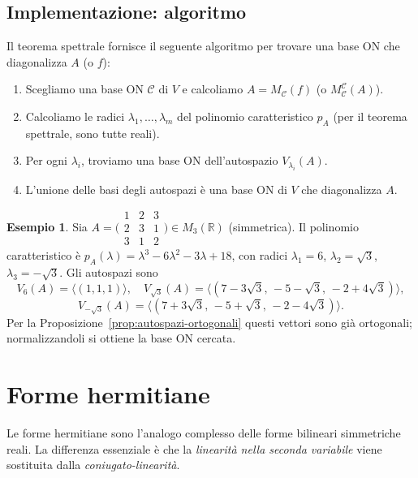 \documentclass[11pt, a4paper]{book}
\theoremstyle{definition}
\newtheorem{esempio}[definizione]{Esempio}
\theoremstyle{plain}
\theoremstyle{remark}
\newcommand{\R}{\mathbb{R}}
\begin{document}
\subsection{Implementazione: algoritmo}

Il teorema spettrale fornisce il seguente algoritmo per trovare una base ON che diagonalizza $A$ (o $f$):

\begin{enumerate}
  \item Scegliamo una base ON $\mathcal{C}$ di $V$ e calcoliamo $A = M_\mathcal{C}(f)$ (o $M^\mathcal{C}_\mathcal{C}(A)$).
  \item Calcoliamo le radici $\lambda_1,\ldots,\lambda_m$ del polinomio caratteristico $p_A$ (per il teorema spettrale, sono tutte reali).
  \item Per ogni $\lambda_i$, troviamo una base ON dell'autospazio $V_{\lambda_i}(A)$.
  \item L'unione delle basi degli autospazi è una base ON di $V$ che diagonalizza $A$.
\end{enumerate}

\begin{exbox}
\begin{esempio}
Sia $A = \bigl(\begin{smallmatrix}1&2&3\\2&3&1\\3&1&2\end{smallmatrix}\bigr) \in M_3(\R)$ (simmetrica). Il polinomio caratteristico è $p_A(\lambda) = \lambda^3-6\lambda^2-3\lambda+18$, con radici $\lambda_1 = 6$, $\lambda_2 = \sqrt{3}$, $\lambda_3 = -\sqrt{3}$. Gli autospazi sono
\[
  V_6(A) = \langle (1,1,1)\rangle, \quad V_{\sqrt{3}}(A) = \langle (7-3\sqrt{3},\,-5-\sqrt{3},\,-2+4\sqrt{3})\rangle,
\]
\[
  V_{-\sqrt{3}}(A) = \langle (7+3\sqrt{3},\,-5+\sqrt{3},\,-2-4\sqrt{3})\rangle.
\]
Per la Proposizione~\ref{prop:autospazi-ortogonali} questi vettori sono già ortogonali; normalizzandoli si ottiene la base ON cercata.
\end{esempio}
\end{exbox}

\section{Forme hermitiane}
\label{sec:forme-hermitiane}

Le forme hermitiane sono l'analogo complesso delle forme bilineari simmetriche reali. La differenza essenziale è che la \emph{linearità nella seconda variabile} viene sostituita dalla \emph{coniugato-linearità}.
\end{document}
